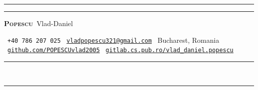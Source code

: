 \documentclass[a4paper,10pt]{article}
\begin{document}
\color{body}

\begin{center}
  {\color{gold}\rule{1.8cm}{0.5pt}}%
  \enspace%
  {\color{gold}\rule{1.8cm}{0.5pt}}

  \vspace{6pt}

  {\fontsize{29}{33}\selectfont
    \textbf{\textsc{\color{navy}Popescu}}%
    \,{\mdseries\color{ink}Vlad-Daniel}}

  \vspace{6pt}

  {\small\color{sub}
    \faPhone\ \texttt{+40\,786\,207\,025}%
    \enspace{\color{rule}|}\enspace
    \faEnvelope\ \href{mailto:vladpopescu321@gmail.com}{\texttt{vladpopescu321@gmail.com}}%
    \enspace{\color{rule}|}\enspace
    \faMapMarker*\ Bucharest, Romania%
    \enspace{\color{rule}|}\enspace
    \faGithub\ \href{https://github.com/POPESCUvlad2005}{\texttt{github.com/POPESCUvlad2005}}%
    \enspace{\color{rule}|}\enspace
    \faGitlab\ \href{https://gitlab.cs.pub.ro/vlad\_daniel.popescu}{\texttt{gitlab.cs.pub.ro/vlad\_daniel.popescu}}%
  }

  \vspace{6pt}
  {\color{gold}\rule{\linewidth}{0.8pt}}\\[-1pt]
  {\color{rule}\rule{\linewidth}{0.3pt}}
\end{center}

\vspace{6pt}
\end{document}
